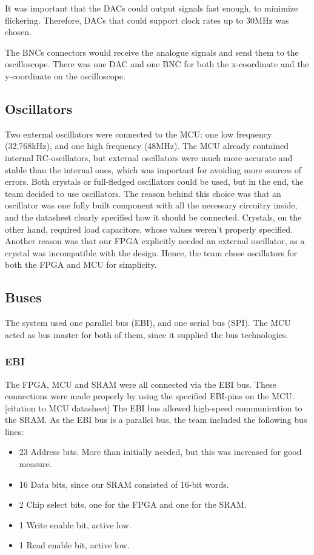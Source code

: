It was important that the DACs could output signals fast enough, to minimize flickering. 
Therefore, DACs that could support clock rates up to 30MHz was chosen.

The BNCs connectors would receive the analogue signals and send them to the oscilloscope.
There was one DAC and one BNC for both the x-coordinate and the y-coordinate on the oscilloscope.

\subsection{Oscillators}
Two external oscillators were connected to the MCU: one low frequency (32,768kHz), and one high frequency (48MHz).
The MCU already contained internal RC-oscillators, but external oscillators were much more accurate and stable than the internal ones, which was important for avoiding more sources of errors.
Both crystals or full-fledged oscillators could be used, but in the end, the team decided to use oscillators.
The reason behind this choice was that an oscillator was one fully built component with all the necessary circuitry inside, and the datasheet clearly specified how it should be connected.
Crystals, on the other hand, required load capacitors, whose values weren't properly specified.
Another reason was that our FPGA explicitly needed an external oscillator, as a crystal was incompatible with the design.
Hence, the team chose oscillators for both the FPGA and MCU for simplicity.

\subsection{Buses}
The system used one parallel bus (EBI), and one serial bus (SPI).
The MCU acted as bus master for both of them, since it supplied the bus technologies.

\subsubsection{EBI}
The FPGA, MCU and SRAM were all connected via the EBI bus.
These connections were made properly by using the specified EBI-pins on the MCU. [citation to MCU datasheet]
The EBI bus allowed high-speed communication to the SRAM.
As the EBI bus is a parallel bus, the team included the following bus lines:
\begin{itemize}
\item 23 Address bits. More than initially needed, but this was increased for good measure.
\item 16 Data bits, since our SRAM consisted of 16-bit words.
\item 2 Chip select bits, one for the FPGA and one for the SRAM.
\item 1 Write enable bit, active low.
\item 1 Read enable bit, active low.
\end{itemize}

